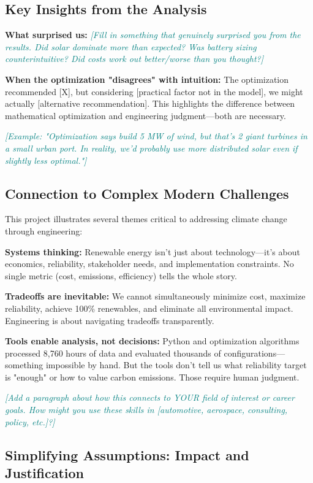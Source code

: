 \documentclass[11pt,letterpaper]{article}
\newcommand{\hint}[1]{\textcolor{teal}{\small\textit{[#1]}}}
\begin{document}
\subsection{Key Insights from the Analysis}

\textbf{What surprised us:} \hint{Fill in something that genuinely surprised you from the results. Did solar dominate more than expected? Was battery sizing counterintuitive? Did costs work out better/worse than you thought?}

\textbf{When the optimization "disagrees" with intuition:} The optimization recommended [X], but considering [practical factor not in the model], we might actually [alternative recommendation]. This highlights the difference between mathematical optimization and engineering judgment—both are necessary.

\hint{Example: "Optimization says build 5 MW of wind, but that's 2 giant turbines in a small urban port. In reality, we'd probably use more distributed solar even if slightly less optimal."}

\subsection{Connection to Complex Modern Challenges}

This project illustrates several themes critical to addressing climate change through engineering:

\textbf{Systems thinking:} Renewable energy isn't just about technology—it's about economics, reliability, stakeholder needs, and implementation constraints. No single metric (cost, emissions, efficiency) tells the whole story.

\textbf{Tradeoffs are inevitable:} We cannot simultaneously minimize cost, maximize reliability, achieve 100\% renewables, and eliminate all environmental impact. Engineering is about navigating tradeoffs transparently.

\textbf{Tools enable analysis, not decisions:} Python and optimization algorithms processed 8,760 hours of data and evaluated thousands of configurations—something impossible by hand. But the tools don't tell us what reliability target is "enough" or how to value carbon emissions. Those require human judgment.

\hint{Add a paragraph about how this connects to YOUR field of interest or career goals. How might you use these skills in [automotive, aerospace, consulting, policy, etc.]?}

\subsection{Simplifying Assumptions: Impact and Justification}
\end{document}
